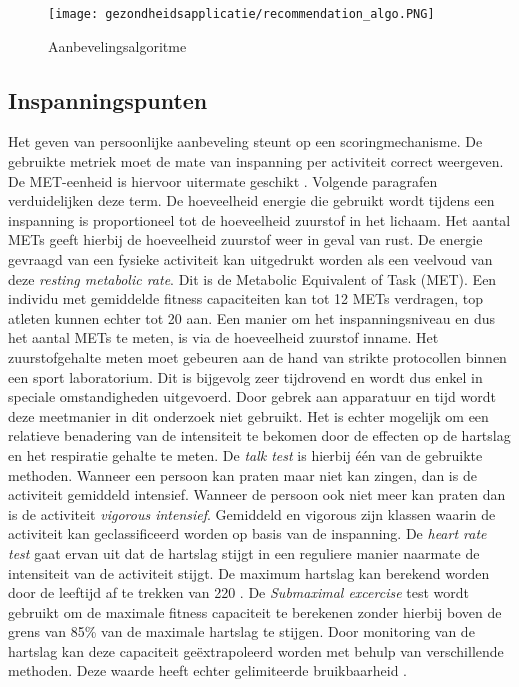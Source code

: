 \begin{figure}[!htpd]
\centering
\caption{Aanbevelingsalgoritme}\label{fig:algo}
\texttt{[image: gezondheidsapplicatie/recommendation\_algo.PNG]} 
\end{figure}

\subsection{Inspanningspunten} \label{subsection:inspanningspunten}
Het geven van persoonlijke aanbeveling steunt op een scoringmechanisme. De gebruikte metriek moet de mate van inspanning per activiteit correct weergeven. De MET-eenheid is hiervoor uitermate geschikt \cite{ref21}. Volgende paragrafen verduidelijken deze term.
De hoeveelheid energie die gebruikt wordt tijdens een inspanning is proportioneel tot de hoeveelheid zuurstof in het lichaam. Het aantal METs geeft hierbij de hoeveelheid zuurstof weer in geval van rust. De energie gevraagd van een fysieke activiteit kan uitgedrukt worden als een veelvoud van deze \textit{resting metabolic rate}. Dit is de Metabolic Equivalent of Task (MET). Een individu met gemiddelde fitness capaciteiten kan tot 12 METs verdragen, top atleten kunnen echter tot 20 aan. 
Een manier om het inspanningsniveau en dus het aantal METs te meten, is via de hoeveelheid zuurstof inname. Het zuurstofgehalte meten moet gebeuren aan de hand van strikte protocollen binnen een sport laboratorium. Dit is bijgevolg zeer tijdrovend en wordt dus enkel in speciale omstandigheden uitgevoerd. Door gebrek aan apparatuur en tijd wordt deze meetmanier in dit onderzoek niet gebruikt. 
Het is echter mogelijk om een relatieve benadering van de intensiteit te bekomen door de effecten op de hartslag en het respiratie gehalte te meten. 
De \textit{talk test} is hierbij één van de gebruikte methoden. Wanneer een persoon kan praten maar niet kan zingen, dan is de activiteit gemiddeld intensief. Wanneer de persoon ook niet meer kan praten dan is de activiteit \textit{vigorous intensief}. Gemiddeld en vigorous zijn klassen waarin de activiteit kan geclassificeerd worden op basis van de inspanning.
De \textit{heart rate test} gaat ervan uit dat de hartslag stijgt in een reguliere manier naarmate de intensiteit van de activiteit stijgt. De maximum hartslag kan berekend worden door de leeftijd af te trekken van 220 \cite{ref73}. 
De \textit{Submaximal excercise} test wordt gebruikt om de maximale fitness capaciteit te berekenen zonder hierbij boven de grens van 85\% van de maximale hartslag te stijgen. Door monitoring van de hartslag kan deze capaciteit geëxtrapoleerd worden met behulp van verschillende methoden. Deze waarde heeft echter gelimiteerde bruikbaarheid \cite{ref71}.

